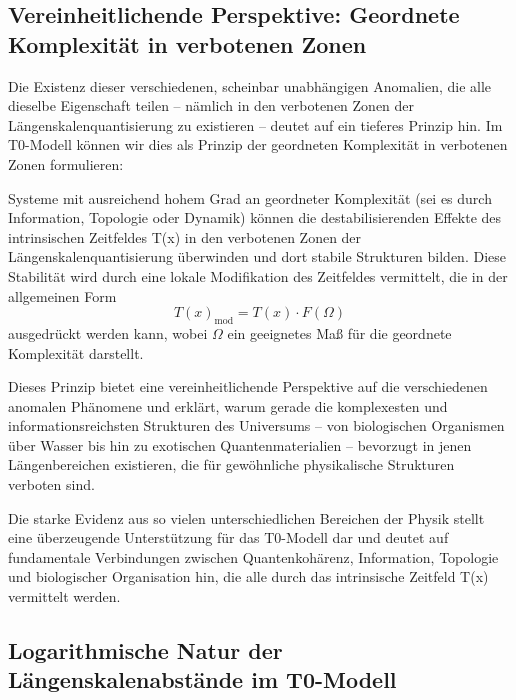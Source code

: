 \documentclass[12pt,a4paper]{article}
\newcommand{\Tfield}{T(x)}
\begin{document}
	\subsection{Vereinheitlichende Perspektive: Geordnete Komplexität in verbotenen Zonen}
	\label{subsec:geordnete_komplexitaet}
	
	Die Existenz dieser verschiedenen, scheinbar unabhängigen Anomalien, die alle dieselbe Eigenschaft teilen – nämlich in den verbotenen Zonen der Längen\-skalen\-quantisierung zu existieren – deutet auf ein tieferes Prinzip hin. Im T0-Modell können wir dies als \glqq Prinzip der geordneten Komplexität in verbotenen Zonen\grqq{} formulieren:
	
	\begin{tcolorbox}[colback=blue!5!white,colframe=blue!75!black,title=Prinzip der geordneten Komplexität in verbotenen Zonen]
		Systeme mit ausreichend hohem Grad an geordneter Komplexität (sei es durch Information, Topologie oder Dynamik) können die destabilisierenden Effekte des intrinsischen Zeitfeldes \Tfield{} in den verbotenen Zonen der Längen\-skalen\-quantisierung überwinden und dort stabile Strukturen bilden. Diese Stabilität wird durch eine lokale Modifikation des Zeitfeldes vermittelt, die in der allgemeinen Form
		\begin{equation}
			\Tfield_{\text{mod}} = \Tfield \cdot F(\Omega)
		\end{equation}
		ausgedrückt werden kann, wobei $\Omega$ ein geeignetes Maß für die geordnete Komplexität darstellt.
	\end{tcolorbox}
	
	Dieses Prinzip bietet eine vereinheitlichende Perspektive auf die verschiedenen anomalen Phänomene und erklärt, warum gerade die komplexesten und informationsreichsten Strukturen des Universums – von biologischen Organismen über Wasser bis hin zu exotischen Quantenmaterialien – bevorzugt in jenen Längen\-bereichen existieren, die für gewöhnliche physikalische Strukturen \glqq verboten\grqq{} sind.
	
	Die starke Evidenz aus so vielen unterschiedlichen Bereichen der Physik stellt eine überzeugende Unterstützung für das T0-Modell dar und deutet auf fundamentale Verbindungen zwischen Quanten\-kohärenz, Information, Topologie und biologischer Organisation hin, die alle durch das intrinsische Zeitfeld \Tfield{} vermittelt werden.
	
	\subsection{Logarithmische Natur der Längenskalenabstände im T0-Modell}
	\label{subsec:logarithmische_natur}
	
\end{document}
